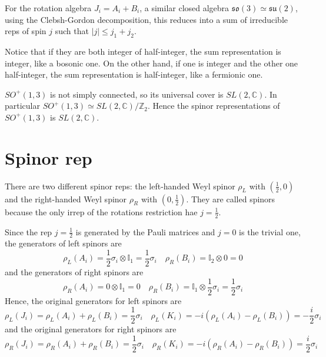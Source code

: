     For the rotation algebra $J_i = A_i + B_i$, a similar closed algebra $\mathfrak{so}(3) \simeq \mathfrak{su}(2)$, using the Clebsh-Gordon decomposition, this reduces into a sum of irreducible reps of spin $j$ such that $|j| \leq j_1 + j_2$.

    Notice that if they are both integer of half-integer, the sum representation is integer, like a bosonic one. On the other hand, if one is integer and the other one half-integer, the sum representation is half-integer, like a fermionic one. 

    $SO^+(1,3)$ is not simply connected, so its universal cover is $SL(2, \mathbb C)$. In particular $SO^+(1,3) \simeq SL(2, \mathbb C)/\mathbb Z_2$. Hence the spinor representations of $SO^+(1,3)$ is $SL(2, \mathbb C)$.

\section{Spinor rep}

    There are two different spinor reps: the left-handed Weyl spinor $\rho_L$ with $(\frac{1}{2}, 0)$ and the right-handed Weyl spinor $\rho_R$ with $(0, 
    \frac{1}{2})$. They are called spinors because the only irrep of the rotations restriction hae $j = \frac{1}{2}$.

    Since the rep $j = \frac{1}{2}$ is generated by the Pauli matrices and $j=0$ is the trivial one, the generators of left spinors are 
    \begin{equation*}
        \rho_L(A_i) = \frac{1}{2} \sigma_i \otimes \mathbb I_1 = \frac{1}{2} \sigma_i \quad \rho_R(B_i) = \mathbb I_2 \otimes 0 = 0
    \end{equation*}
    and the generators of right spinors are
    \begin{equation*}
        \rho_R(A_i) = 0 \otimes \mathbb I_1 = 0 \quad \rho_R(B_i) = \mathbb I_1 \otimes \frac{1}{2} \sigma_i = \frac{1}{2} \sigma_i
    \end{equation*}
    Hence, the original generators for left spinors are 
    \begin{equation*}
        \rho_L (J_i) = \rho_L(A_i) + \rho_L(B_i) = \frac{1}{2} \sigma_i \quad \rho_L(K_i) = - i (\rho_L(A_i) - \rho_L(B_i)) = - \frac{i}{2} \sigma_i
    \end{equation*}
    and the original generators for right spinors are 
    \begin{equation*}
        \rho_R (J_i) = \rho_R(A_i) + \rho_R(B_i) = \frac{1}{2} \sigma_i \quad \rho_R(K_i) = - i (\rho_R(A_i) - \rho_R(B_i)) = \frac{i}{2} \sigma_i
    \end{equation*}

